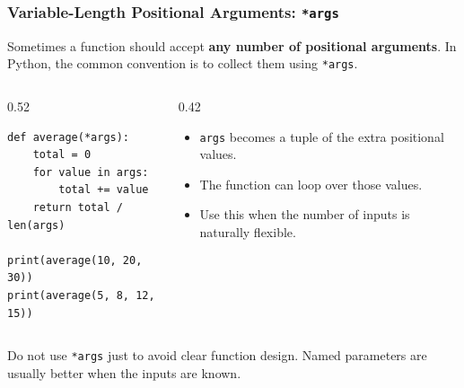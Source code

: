 \documentclass[aspectratio=169,10pt]{beamer}
\newcommand{\keyword}[1]{\textcolor{PrimaryBlue}{\textbf{#1}}}
\newcommand{\codeword}[1]{\texttt{#1}}
\begin{document}
\begin{frame}[fragile]
\frametitle{Variable-Length Positional Arguments: \texttt{*args}}
\small
Sometimes a function should accept \keyword{any number of positional arguments}. In Python, the common convention is to collect them using \codeword{*args}.

\vspace{0.18cm}
\begin{columns}[T,totalwidth=0.96\textwidth]
\begin{column}{0.52\textwidth}
\begin{lstlisting}[style=pycode]
def average(*args):
    total = 0
    for value in args:
        total += value
    return total / len(args)

print(average(10, 20, 30))
print(average(5, 8, 12, 15))
\end{lstlisting}
\end{column}
\begin{column}{0.42\textwidth}
\begin{tcolorbox}[lecturebox,title=What happens?]
\begin{itemize}\setlength\itemsep{0.06cm}
  \item \codeword{args} becomes a tuple of the extra positional values.
  \item The function can loop over those values.
  \item Use this when the number of inputs is naturally flexible.
\end{itemize}
\end{tcolorbox}
\end{column}
\end{columns}

\begin{tcolorbox}[lecturebox,title=Beginner warning]
Do not use \codeword{*args} just to avoid clear function design. Named parameters are usually better when the inputs are known.
\end{tcolorbox}
\end{frame}
\end{document}
